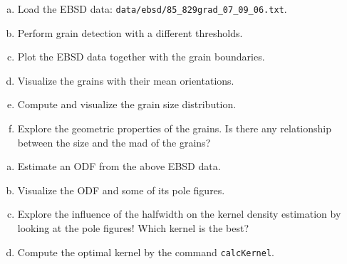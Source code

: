 \documentclass[compress]{beamer}
\begin{document}
\begin{frame}

  \begin{Exercise}
    \begin{enumerate}[a)]
      \item Load the EBSD data:
      \texttt{data/ebsd/85\_829grad\_07\_09\_06.txt}.
      \item Perform grain detection with a different thresholds.
      \item Plot the EBSD data together with the grain boundaries.
      \item Visualize the grains with their mean orientations.
      \item Compute and visualize the grain size distribution.
      \item Explore the geometric properties of the grains. Is there any
      relationship between the size and the mad of the grains?
    \end{enumerate}
  \end{Exercise}

  \begin{Exercise}
    \begin{enumerate}[a)]
      \item Estimate an ODF from the above EBSD data.
      \item Visualize the ODF and some of its pole figures.
      \item Explore the influence of the halfwidth on the kernel
      density estimation by looking at the pole figures! Which kernel is the best?
      \item Compute the optimal kernel by the command \texttt{calcKernel}.
    \end{enumerate}
  \end{Exercise}


\end{frame}


\end{document}
